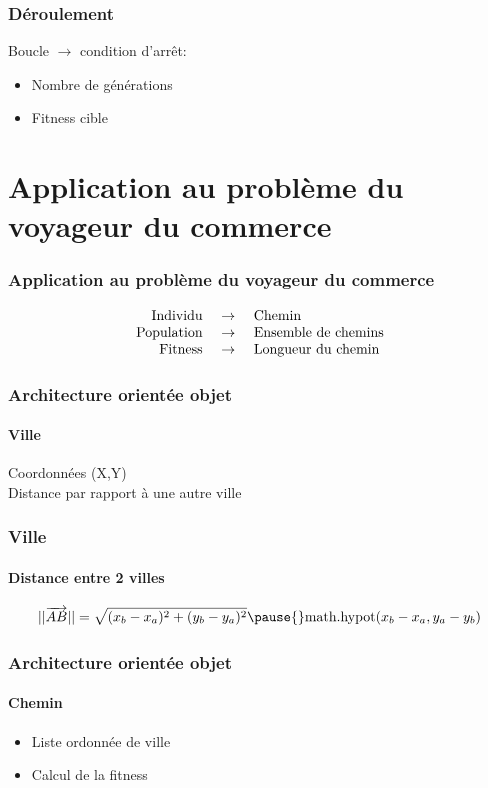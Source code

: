 \documentclass[16pt]{beamer}
\begin{document}
\begin{frame}
  \frametitle{Déroulement}
  Boucle $\rightarrow$ condition d'arrêt:
  \begin{itemize}
    \item Nombre de générations
    \item Fitness cible 
  \end{itemize}
\end{frame}

\section{Application au problème du voyageur du commerce}
\begin{frame}
  \frametitle{Application au problème du voyageur du commerce}
  \begin{block}{}
\[
  \begin{array}{r c l}
    \text{Individu } &\rightarrow& \text{ Chemin} \\
    \text{Population } &\rightarrow& \text{ Ensemble de chemins} \\
    \text{Fitness } &\rightarrow& \text{ Longueur du chemin} 
   \end{array}{}
\]
\end{block}
\end{frame}

\begin{frame}[fragile]
\frametitle{Architecture orientée objet}
\framesubtitle{\textbf{Ville}}
Coordonnées (X,Y) \\
Distance par rapport à une autre ville
\end{frame}

\begin{frame}
  \frametitle{Ville}
  \framesubtitle{Distance entre 2 villes}
  \begin{center}
  \[
    ||\overrightarrow{AB}|| = \sqrt{(x_b - x_a)^2 + (y_b - y_a)^2} \\
  \pause{}
  \text{math.hypot}(x_b - x_a, y_a -  y_b)
  \]
  \end{center}
\end{frame}

\begin{frame}
  \frametitle{Architecture orientée objet}
  \framesubtitle{\textbf{Chemin}}
  \begin{itemize}
    \item Liste ordonnée de ville
    \item Calcul de la fitness
  \end{itemize}
\end{frame}
\end{document}
